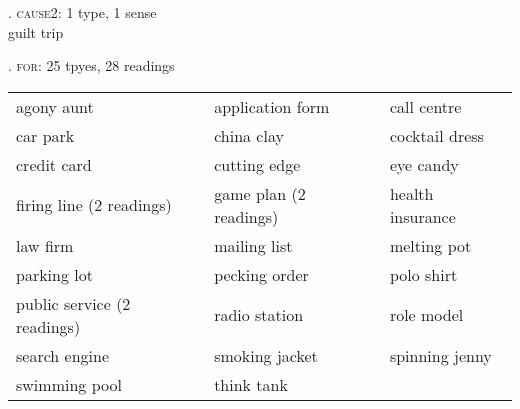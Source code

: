 \ex. \textsc{cause2}: 1 type, 1 sense\\
guilt trip

\newpage
\ex. \textsc{for}: 25 tpyes, 28 readings\\
\begin{tabularx}{.9\textwidth}{lll}
agony aunt&application form&call centre\\       
car park&china clay&cocktail dress\\
credit card&cutting edge&eye candy\\         
firing line (2 readings)&game plan (2 readings)&health insurance\\  
law firm&mailing list&melting pot\\       
parking lot&pecking order&polo shirt\\     
public service  (2 readings)&radio station&role model\\      
search engine&smoking jacket&spinning jenny\\    
swimming pool&think tank&        
\end{tabularx}

